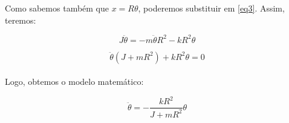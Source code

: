 \documentclass[a4paper, 12pt]{article}
\begin{document}
Como sabemos também que $x = R\theta$, poderemos substituir em \ref{eq3}. Assim, teremos:

\begin{equation}
    J \ddot \theta = -m \ddot \theta R^2 - kR^2\theta
\end{equation}

\begin{equation}
    \ddot \theta ( J + m R^2) + kR^2\theta = 0
\end{equation}\\

Logo, obtemos o modelo matemático:

\begin{equation}
    \ddot \theta = - \frac{kR^2}{J + m R^2} \theta
\end{equation}
\end{document}
